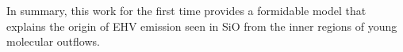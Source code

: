 \documentclass[useAMS,usenatbib,letters]{mn2e}
\begin{document}
In summary, this work for the first time provides a formidable model
that explains the origin of EHV emission seen in SiO from 
the inner regions of young molecular outflows.





\label{lastpage}
\end{document}
